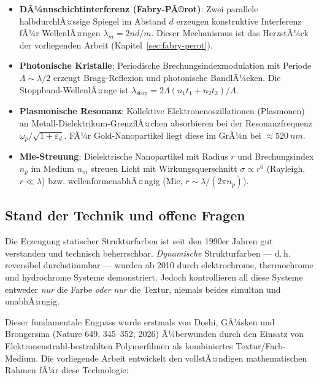 ﻿\documentclass[a4paper,12pt]{article}
\theoremstyle{definition}
\begin{document}
	\begin{itemize}[leftmargin=*]
		\item \textbf{DÃ¼nnschichtinterferenz (Fabry-PÃ©rot)}: Zwei parallele
		halbdurchlÃ¤ssige Spiegel im Abstand $d$ erzeugen konstruktive Interferenz
		fÃ¼r WellenlÃ¤ngen $\lambda_m = 2nd/m$. Dieser Mechanismus ist das
		HerzstÃ¼ck der vorliegenden Arbeit (Kapitel~\ref{sec:fabry-perot}).
		
		\item \textbf{Photonische Kristalle}: Periodische Brechungsindexmodulation
		mit Periode $\Lambda \sim \lambda/2$ erzeugt Bragg-Reflexion und
		photonische BandlÃ¼cken. Die Stoppband-WellenlÃ¤nge ist
		$\lambda_\mathrm{stop} = 2\Lambda(n_1 t_1 + n_2 t_2)/\Lambda$.
		
		\item \textbf{Plasmonische Resonanz}: Kollektive Elektronenoszillationen
		(Plasmonen) an Metall-Dielektrikum-GrenzflÃ¤chen absorbieren bei der
		Resonanzfrequenz $\omega_p/\sqrt{1 + \varepsilon_d}$.
		FÃ¼r Gold-Nanopartikel liegt diese im GrÃ¼n bei $\approx \SI{520}{nm}$.
		
		\item \textbf{Mie-Streuung}: Dielektrische Nanopartikel mit Radius $r$ und
		Brechungsindex $n_p$ im Medium $n_m$ streuen Licht mit
		Wirkungsquerschnitt $\sigma \propto r^6$ (Rayleigh, $r \ll \lambda$)
		bzw. wellenformenabhÃ¤ngig (Mie, $r \sim \lambda/(2\pi n_p)$).
	\end{itemize}
	
	\subsection{Stand der Technik und offene Fragen}
	\label{ssec:stand}
	
	Die Erzeugung statischer Strukturfarben ist seit den 1990er Jahren gut
	verstanden und technisch beherrschbar. \emph{Dynamische} Strukturfarben ---
	d.\,h. reversibel durchstimmbar --- wurden ab 2010 durch elektrochrome,
	thermochrome und hydrochrome Systeme demonstriert. Jedoch kontrollieren all
	diese Systeme entweder \emph{nur} die Farbe \emph{oder} \emph{nur} die Textur,
	niemals beides simultan und unabhÃ¤ngig.
	
	Dieser fundamentale Engpass wurde erstmals von Doshi, GÃ¼sken und Brongersma
	(Nature 649, 345--352, 2026) Ã¼berwunden durch den Einsatz von
	Elektronenstrahl-bestrahlten Polymerfilmen als kombiniertes Textur/Farb-Medium.
	Die vorliegende Arbeit entwickelt den vollstÃ¤ndigen mathematischen Rahmen fÃ¼r
	diese Technologie:
	
\end{document}
